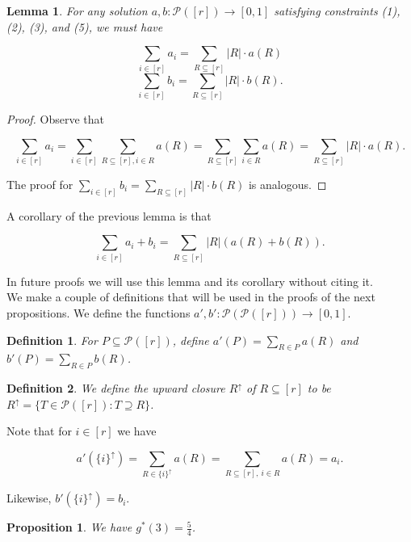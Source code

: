 \documentclass{article}
\newtheorem{proposition}{Proposition}
\newtheorem{definition}{Definition}
\newtheorem{lemma}{Lemma}
\begin{document}
\begin{lemma}
 For any solution $a,b : \mathcal{P}([r]) \rightarrow [0,1]$ satisfying constraints (1), (2), (3), and (5), we must have 
 
 $$\sum_{i \in [r]} a_i = \sum_{R \subseteq [r]} |R| \cdot a(R)$$
 $$\sum_{i \in [r]} b_i = \sum_{R \subseteq [r]} |R| \cdot b(R).$$
\end{lemma}

\begin{proof}
Observe that

$$\sum_{i \in [r]} a_i = \sum_{i \in [r]} \sum_{R \subseteq [r], i \in R} a(R) = \sum_{R \subseteq [r]} \sum_{i \in R} a(R) = \sum_{R \subseteq [r]} |R| \cdot a(R).$$

\noindent
The proof for $\sum_{i \in [r]} b_i = \sum_{R \subseteq [r]} |R| \cdot b(R)$ is analogous.
\end{proof}

A corollary of the previous lemma is that 

$$\sum_{i \in [r]} a_i + b_i = \sum_{R \subseteq [r]} |R| (a(R)+b(R)).$$

\noindent
In future proofs we will use this lemma and its corollary without citing it. \\

We make a couple of definitions that will be used in the proofs of the next propositions. We define the functions $a',b' : \mathcal{P}(\mathcal{P}([r])) \rightarrow [0,1]$.

\begin{definition}
For $P \subseteq \mathcal{P}([r])$, define $a'(P) = \sum_{R \in P} a(R)$ and $b'(P) = \sum_{R \in P} b(R)$.
\end{definition}

\begin{definition}
We define the upward closure $R^{\uparrow}$ of $R \subseteq [r]$ to be $R^{\uparrow} = \{T \in \mathcal{P}([r]) : T \supseteq R \}$.
\end{definition}

\noindent
Note that for $i \in [r]$ we have

$$a'(\{i\}^{\uparrow}) = \sum_{R \in \{i\}^{\uparrow}} a(R) = \sum_{R \subseteq [r], \ i \in R} a(R) = a_i.$$

\noindent
Likewise, $b'(\{i\}^{\uparrow}) = b_i$. \\

\begin{proposition}
We have $g^*(3) = \frac{5}{4}$.
\end{proposition}
\end{document}
